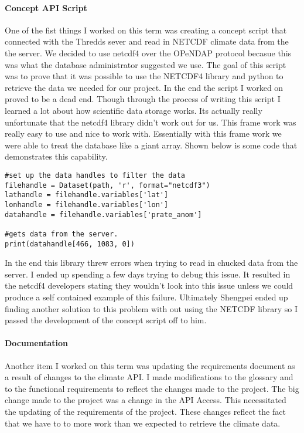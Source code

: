 \documentclass[onecolumn, draftclsnofoot,10pt, compsoc]{article}
\begin{document}
		\paragraph{Concept API Script} \hfill \break
		One of the fist things I worked on this term was creating a concept script that connected with the Thredds sever and read in NETCDF climate data from the the server. We decided to use netcdf4 over the OPeNDAP protocol becasue this was what the database administrator suggested we use. The goal of this script was to prove that it was possible to use the NETCDF4 library and python to retrieve the data we needed for our project. In the end the script I worked on proved to be a dead end. Though through the process of writing this script I learned a lot about how scientific data storage works. Its actually really unfortunate that the netcdf4 library didn't work out for us. This frame work was really easy to use and nice to work with. Essentially with this frame work we were able to treat the database like a giant array. Shown below is some code that demonstrates this capability.

\begin{lstlisting}
#set up the data handles to filter the data
filehandle = Dataset(path, 'r', format="netcdf3")
lathandle = filehandle.variables['lat']
lonhandle = filehandle.variables['lon']
datahandle = filehandle.variables['prate_anom']

#gets data from the server.
print(datahandle[466, 1083, 0])
\end{lstlisting}
		
In the end this library threw errors when trying to read in chucked data from the server. I ended up spending a few days trying to debug this issue. It resulted in the netcdf4 developers stating they wouldn't look into this issue unless we could produce a self contained example of this failure. Ultimately Shengpei ended up finding another solution to this problem with out using the NETCDF library so I passed the development of the concept script off to him.\\

		\paragraph{Documentation} \hfill \break
		Another item I worked on this term was updating the requirements document as a result of changes to the climate API. I made modifications to the glossary and to the functional requirements to reflect the changes made to the project. The big change made to the project was a change in the API Access. This necessitated the updating of the requirements of the project. These changes reflect the fact that we have to to more work than we expected to retrieve the climate data.\\
\end{document}
